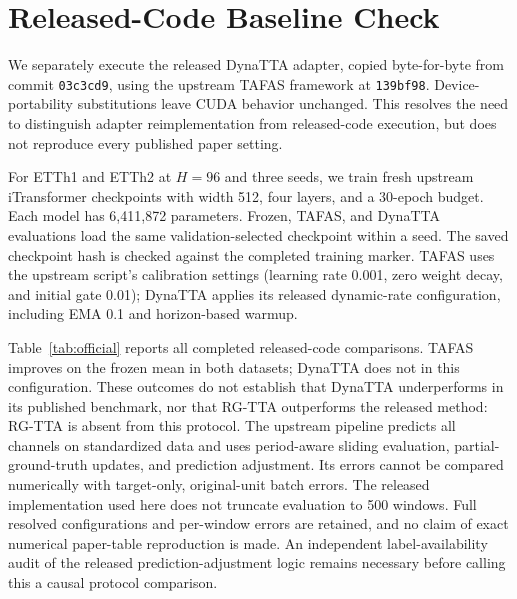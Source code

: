 \documentclass[conference]{IEEEtran}
\begin{document}
\section{Released-Code Baseline Check}\label{sec:official}
We separately execute the released DynaTTA adapter, copied byte-for-byte from commit \texttt{03c3cd9}, using the upstream TAFAS framework at \texttt{139bf98}. Device-portability substitutions leave CUDA behavior unchanged. This resolves the need to distinguish adapter reimplementation from released-code execution, but does not reproduce every published paper setting.

For ETTh1 and ETTh2 at $H=96$ and three seeds, we train fresh upstream iTransformer checkpoints with width 512, four layers, and a 30-epoch budget. Each model has 6,411,872 parameters. Frozen, TAFAS, and DynaTTA evaluations load the same validation-selected checkpoint within a seed. The saved checkpoint hash is checked against the completed training marker. TAFAS uses the upstream script's calibration settings (learning rate 0.001, zero weight decay, and initial gate 0.01); DynaTTA applies its released dynamic-rate configuration, including EMA 0.1 and horizon-based warmup.

\begin{table}[t]
\centering
\caption{Released-code pipeline, standardized multivariate errors on 3,389 test windows per run. Three seeds, mean $\pm$ sample SD. Evaluation time excludes source training. This is a separate protocol; RG-TTA is not evaluated in this table.}
\label{tab:official}

\end{table}

Table~\ref{tab:official} reports all completed released-code comparisons. TAFAS improves on the frozen mean in both datasets; DynaTTA does not in this configuration. These outcomes do not establish that DynaTTA underperforms in its published benchmark, nor that RG-TTA outperforms the released method: RG-TTA is absent from this protocol. The upstream pipeline predicts all channels on standardized data and uses period-aware sliding evaluation, partial-ground-truth updates, and prediction adjustment. Its errors cannot be compared numerically with target-only, original-unit batch errors. The released implementation used here does not truncate evaluation to 500 windows. Full resolved configurations and per-window errors are retained, and no claim of exact numerical paper-table reproduction is made. An independent label-availability audit of the released prediction-adjustment logic remains necessary before calling this a causal protocol comparison.
\end{document}
